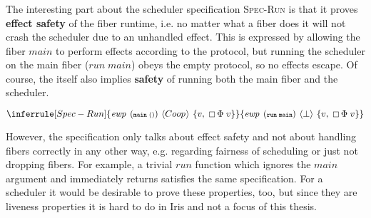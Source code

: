 \subsubsection{}
\label{sec:sched-spec-run}

The interesting part about the scheduler specification \textsc{Spec-Run} is that it proves \textbf{effect safety} of the fiber runtime, i.e. no matter what a fiber does it will not crash the scheduler due to an unhandled effect.
This is expressed by allowing the fiber \(main\) to perform effects according to the \proto{} protocol, but running the scheduler on the main fiber (\(run\; main\)) obeys the empty protocol, so no effects escape.
Of course, the \ewpt{} itself also implies \textbf{safety} of running both the main fiber and the scheduler.

\[
  \inferrule[Spec-Run]
  {\ewp{main\; ()}{\proto{}}{v,\; \always \Phi\; v}}
  {\ewp{run\; main}{\bot}{v,\; \always \Phi\; v}}
\]


However, the specification only talks about effect safety and not about handling fibers correctly in any other way, e.g. regarding fairness of scheduling or just not dropping fibers.
For example, a trivial \(run\) function which ignores the \(main\) argument and immediately returns satisfies the same specification.
For a scheduler it would be desirable to prove these properties, too, but since they are liveness properties it is hard to do in Iris and not a focus of this thesis.

\subsubsection{}
\label{sec:sched-spec-fork}

